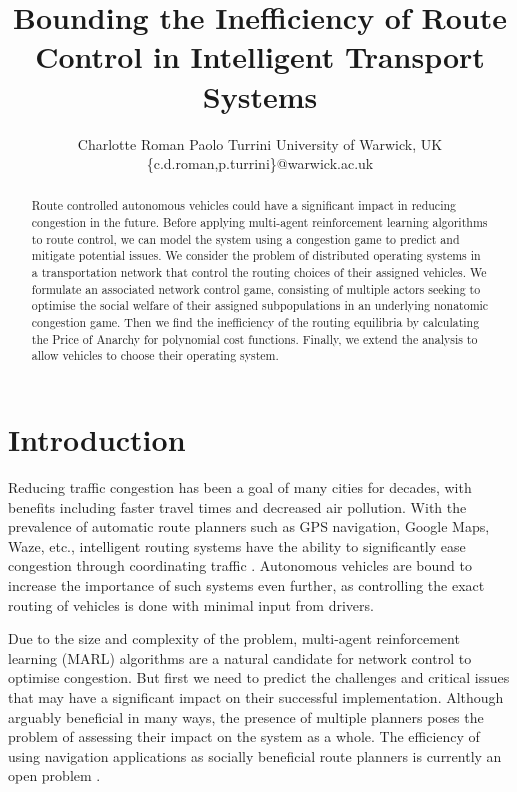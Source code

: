 \documentclass{article}
\title{Bounding the Inefficiency of Route Control in Intelligent Transport Systems}
\author{
Charlotte Roman \And Paolo Turrini
\affiliations
University of Warwick, UK\\
\emails
\{c.d.roman,p.turrini\}@warwick.ac.uk
}
\begin{document}
\maketitle

\begin{abstract}
 Route controlled autonomous vehicles could have a significant impact in reducing congestion in the future. Before applying multi-agent reinforcement learning algorithms to route control, we can model the system using a congestion game to predict and mitigate potential issues.
 We consider the problem of distributed operating systems in a transportation network that control the routing choices of their assigned vehicles. We formulate an associated network control game, consisting of multiple actors seeking to optimise the social welfare of their assigned subpopulations in an underlying nonatomic congestion game. Then we find the inefficiency of the routing equilibria by calculating the Price of Anarchy for polynomial cost functions. Finally, we extend the analysis to allow vehicles to choose their operating system.
\end{abstract}

\section{Introduction}
  Reducing traffic congestion has been a goal of many cities for decades, with benefits including faster travel times and decreased air pollution. With the prevalence of automatic route planners such as GPS navigation, Google Maps, Waze, etc., intelligent routing systems have the ability to significantly ease congestion through coordinating traffic \cite{Cheng2020}. 
  Autonomous vehicles are bound to increase the importance of such systems even further, as controlling the exact routing of vehicles is done with minimal input from drivers. 
  
  Due to the size and complexity of the problem, multi-agent reinforcement learning (MARL) algorithms are a natural candidate for network control to optimise congestion. But first we need to predict the challenges and critical issues that may have a significant impact on their successful implementation.
  Although arguably beneficial in many ways, the presence of multiple planners poses the problem of assessing their impact on the system as a whole. The efficiency of using navigation applications as socially beneficial route planners is currently an open problem \cite{Dafoe2020}. 
\end{document}
